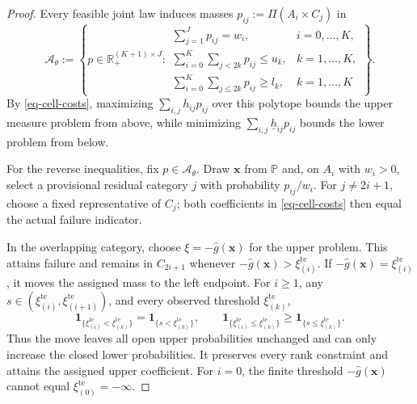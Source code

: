 \documentclass[review,11pt,3p,authoryear,nopreprintline]{elsarticle}
\begin{document}
\begin{proof}
  Every feasible joint law induces masses $p_{ij}:=\Pi(A_i\times C_j)$ in
  \begin{equation}
    \mathcal A_\theta:=
    \left\{p\in\mathbb R_+^{(K+1)\times J}:
    \begin{array}{ll}
      \displaystyle\sum_{j=1}^Jp_{ij}=w_i,
        &i=0,\ldots,K,\\[1mm]
      \displaystyle\sum_{i=0}^K\sum_{j<2k}p_{ij}\le u_k,
        &k=1,\ldots,K,\\[1mm]
      \displaystyle\sum_{i=0}^K\sum_{j\le2k}p_{ij}\ge l_k,
        &k=1,\ldots,K
    \end{array}\right\}.
    \label{eq-cell-mass-polytope}
  \end{equation}
  By \eqref{eq-cell-costs}, maximizing $\sum_{i,j}\overline h_{ij}p_{ij}$ over this polytope bounds the upper measure problem from above, while minimizing $\sum_{i,j}\underline h_{ij}p_{ij}$ bounds the lower problem from below.

  For the reverse inequalities, fix $p\in\mathcal A_\theta$. Draw $\bm x$ from $\mathbb P$ and, on $A_i$ with $w_i>0$, select a provisional residual category $j$ with probability $p_{ij}/w_i$. For $j\ne2i+1$, choose a fixed representative of $C_j$; both coefficients in \eqref{eq-cell-costs} then equal the actual failure indicator.

  In the overlapping category, choose $\xi=-\hat g(\bm x)$ for the upper problem. This attains failure and remains in $C_{2i+1}$ whenever $-\hat g(\bm x)>\xi_{(i)}^{\mathrm{te}}$. If $-\hat g(\bm x)=\xi_{(i)}^{\mathrm{te}}$, it moves the assigned mass to the left endpoint. For $i\ge1$, any $s\in(\xi_{(i)}^{\mathrm{te}},\xi_{(i+1)}^{\mathrm{te}})$, and every observed threshold $\xi_{(k)}^{\mathrm{te}}$,
  \begin{equation}
    \mathbf1_{\{\xi_{(i)}^{\mathrm{te}}<\xi_{(k)}^{\mathrm{te}}\}}=\mathbf1_{\{s<\xi_{(k)}^{\mathrm{te}}\}},\qquad
    \mathbf1_{\{\xi_{(i)}^{\mathrm{te}}\le \xi_{(k)}^{\mathrm{te}}\}}\ge\mathbf1_{\{s\le \xi_{(k)}^{\mathrm{te}}\}}.
    \label{eq-endpoint-move}
  \end{equation}
  Thus the move leaves all open upper probabilities unchanged and can only increase the closed lower probabilities. It preserves every rank constraint and attains the assigned upper coefficient. For $i=0$, the finite threshold $-\hat g(\bm x)$ cannot equal $\xi_{(0)}^{\mathrm{te}}=-\infty$.


\end{proof}
\end{document}
